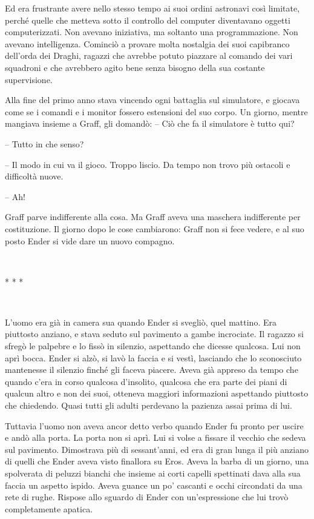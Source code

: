 {Ed era frustrante avere nello stesso tempo ai suoi ordini astronavi
	così limitate, perché quelle che metteva sotto il controllo del computer
	diventavano oggetti computerizzati. Non avevano iniziativa, ma soltanto
	una programmazione. Non avevano intelligenza. Cominciò a provare molta
	nostalgia dei suoi capibranco dell'orda dei Draghi, ragazzi che avrebbe
	potuto piazzare al comando dei vari squadroni e che avrebbero agito bene
	senza bisogno della sua costante supervisione.}

{Alla fine del primo anno stava vincendo ogni battaglia sul simulatore,
	e giocava come se i comandi e i monitor fossero estensioni del suo
	corpo. Un giorno, mentre mangiava insieme a Graff, gli domandò: -- Ciò
	che fa il simulatore è tutto qui?}

{-- Tutto in che senso?}

{-- Il modo in cui va il gioco. Troppo liscio. Da tempo non trovo più
	ostacoli e difficoltà nuove.}

{-- Ah!}

{Graff parve indifferente alla cosa. Ma Graff aveva una maschera
	indifferente per costituzione. Il giorno dopo le cose cambiarono: Graff
	non si fece vedere, e al suo posto Ender si vide dare un nuovo
	compagno.}

{~}

\begin{center}
	{* * *}
\end{center}

{~}

{L'uomo era già in camera sua quando Ender si svegliò, quel mattino. Era
	piuttosto anziano, e stava seduto sul pavimento a gambe incrociate. Il
	ragazzo si sfregò le palpebre e lo fissò in silenzio, aspettando che
	dicesse qualcosa. Lui non aprì bocca. Ender si alzò, si lavò la faccia e
	si vestì, lasciando che lo sconosciuto mantenesse il silenzio finché gli
	faceva piacere. Aveva già appreso da tempo che quando c'era in corso
	qualcosa d'insolito, qualcosa che era parte dei piani di qualcun altro e
	non dei suoi, otteneva maggiori informazioni aspettando piuttosto che
	chiedendo. Quasi tutti gli adulti perdevano la pazienza assai prima di
	lui.}

{Tuttavia l'uomo non aveva ancor detto verbo quando Ender fu pronto per
	uscire e andò alla porta. La porta non si aprì. Lui si volse a fissare
	il vecchio che sedeva sul pavimento. Dimostrava più di sessant'anni, ed
	era di gran lunga il più anziano di quelli che Ender aveva visto
	finallora su Eros. Aveva la barba di un giorno, una spolverata di
	peluzzi bianchi che insieme ai corti capelli spettinati dava alla sua
	faccia un aspetto ispido. Aveva guance un po' cascanti e occhi
	circondati da una rete di rughe. Rispose allo sguardo di Ender con
	un'espressione che lui trovò completamente apatica.}

